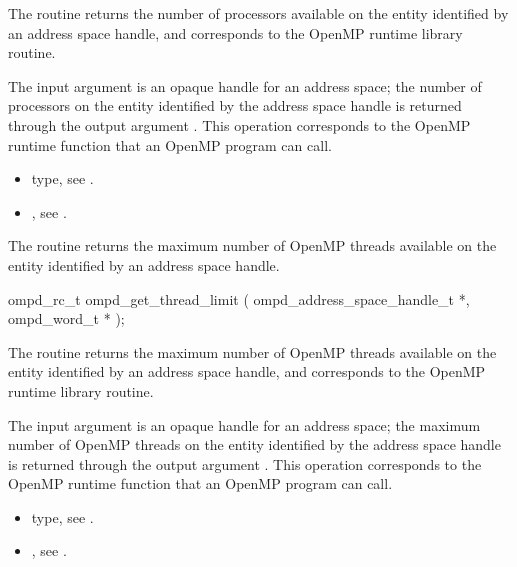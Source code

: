 \descr
The  routine returns the number of processors
available on the entity identified by an address space handle, and corresponds to the
 OpenMP runtime library routine.

\argdesc
The input argument  is an opaque handle for an address space;
the number of processors on the entity identified by the address space
handle is returned through the output argument .
This operation corresponds to the OpenMP runtime function
 that an OpenMP program can call.

\crossreferences	
\begin{itemize}
	\item {} type, see .
	\item {}, see .
\end{itemize}

\label{subsubsubsec:ompd_get_thread_limit}
\summary
The  routine returns the maximum
number of OpenMP threads available on the entity identified by
an address space handle.

\format

\begin{cspecific}
\begin{ompSyntax}
ompd_rc_t ompd_get_thread_limit (
  ompd_address_space_handle_t *,
  ompd_word_t *
);
\end{ompSyntax}
\end{cspecific}


\descr
The  routine returns the maximum
number of OpenMP threads available on the entity identified by
an address space handle, and corresponds to the  OpenMP
runtime library routine.

\argdesc
The input argument  is an opaque handle for an address space;
the maximum number of OpenMP threads on the entity identified by the
address space handle is returned through the output argument .
This operation corresponds to the OpenMP runtime function
 that an OpenMP program can call.

\crossreferences	
\begin{itemize}
	\item {} type, see .
	\item {}, see .
\end{itemize}


